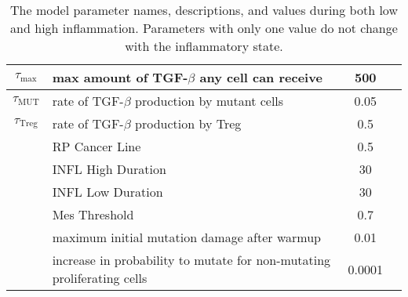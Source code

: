\documentclass[11pt, a4paper, preprint]{article}
\begin{document}
\begin{table}[H]
\begin{center}
\begin{tabular}{|| c | p{7cm} | c | c ||}
 $\tau_\text{max}$ & max amount of TGF-$\beta$ any cell can receive & 500 &\\
  \hline 
 $\tau_\text{MUT}$ & rate of TGF-$\beta$ production by mutant cells & 0.05 & \\
  \hline
 $\tau_\text{Treg}$ & rate of TGF-$\beta$ production by Treg & 0.5 & \\
  \hline
  & RP Cancer Line  & 0.5 &  \\ 
 \hline
&  INFL High Duration & 30&   \\
 \hline
 & INFL Low Duration &30 &   \\
 \hline
& Mes Threshold & 0.7 &    \\
 \hline
  & maximum initial mutation damage after warmup  & 0.01 &\\
  \hline
  & increase in probability to mutate for non-mutating proliferating cells & 0.0001 & \\
  \hline
\end{tabular}
  \caption{The model parameter names, descriptions, and values during both low and high inflammation. Parameters with only one value do not change with the inflammatory state.}
\end{center}
\end{table}
\end{document}
